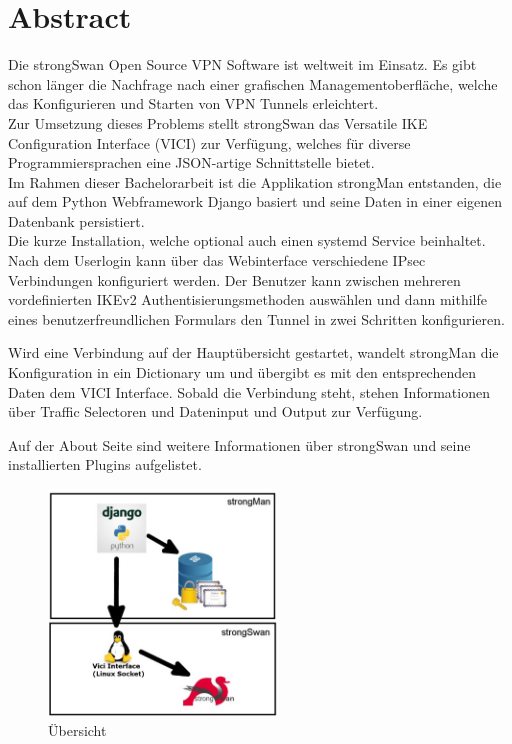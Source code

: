 \section{Abstract}
Die strongSwan Open Source VPN Software ist weltweit im Einsatz. Es gibt schon länger die Nachfrage nach einer grafischen Managementoberfläche, welche das Konfigurieren und Starten von VPN Tunnels erleichtert.\\
Zur Umsetzung dieses Problems stellt strongSwan das Versatile IKE Configuration Interface (VICI) zur Verfügung, welches für diverse Programmiersprachen eine JSON-artige Schnittstelle bietet. \\
Im Rahmen dieser Bachelorarbeit ist die Applikation strongMan entstanden, die auf dem Python Webframework Django basiert und seine Daten in einer eigenen Datenbank persistiert.\\

Die kurze Installation, welche optional auch einen systemd Service beinhaltet. Nach dem Userlogin kann über das Webinterface verschiedene IPsec Verbindungen konfiguriert werden. Der Benutzer kann zwischen mehreren vordefinierten IKEv2 Authentisierungsmethoden auswählen und dann mithilfe eines benutzerfreundlichen Formulars den Tunnel in zwei Schritten konfigurieren. 

Wird eine Verbindung auf der Hauptübersicht gestartet, wandelt strongMan die Konfiguration in ein Dictionary um und übergibt es mit den entsprechenden Daten dem VICI Interface. Sobald die Verbindung steht, stehen Informationen über Traffic Selectoren und Dateninput und Output zur Verfügung.

Auf der About Seite sind weitere Informationen über strongSwan und seine installierten Plugins aufgelistet.\\

\begin{figure}
  \begin{center}
    \includegraphics[width=230px]{images/abstract_overview.jpg}
  \end{center}
    \caption[Übersicht]{Übersicht}
\end{figure}

